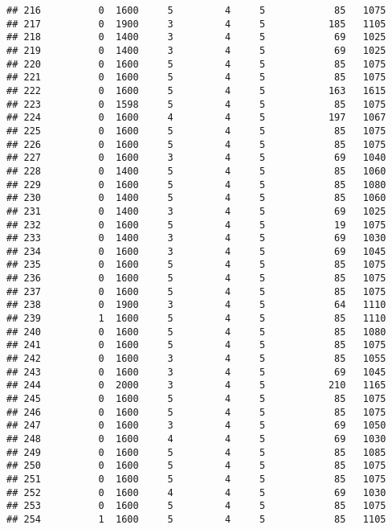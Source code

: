 \documentclass[]{article}
\begin{document}
\begin{verbatim}
## 216          0  1600     5         4     5            85   1075
## 217          0  1900     3         4     5           185   1105
## 218          0  1400     3         4     5            69   1025
## 219          0  1400     3         4     5            69   1025
## 220          0  1600     5         4     5            85   1075
## 221          0  1600     5         4     5            85   1075
## 222          0  1600     5         4     5           163   1615
## 223          0  1598     5         4     5            85   1075
## 224          0  1600     4         4     5           197   1067
## 225          0  1600     5         4     5            85   1075
## 226          0  1600     5         4     5            85   1075
## 227          0  1600     3         4     5            69   1040
## 228          0  1400     5         4     5            85   1060
## 229          0  1600     5         4     5            85   1080
## 230          0  1400     5         4     5            85   1060
## 231          0  1400     3         4     5            69   1025
## 232          0  1600     5         4     5            19   1075
## 233          0  1400     3         4     5            69   1030
## 234          0  1600     3         4     5            69   1045
## 235          0  1600     5         4     5            85   1075
## 236          0  1600     5         4     5            85   1075
## 237          0  1600     5         4     5            85   1075
## 238          0  1900     3         4     5            64   1110
## 239          1  1600     5         4     5            85   1110
## 240          0  1600     5         4     5            85   1080
## 241          0  1600     5         4     5            85   1075
## 242          0  1600     3         4     5            85   1055
## 243          0  1600     3         4     5            69   1045
## 244          0  2000     3         4     5           210   1165
## 245          0  1600     5         4     5            85   1075
## 246          0  1600     5         4     5            85   1075
## 247          0  1600     3         4     5            69   1050
## 248          0  1600     4         4     5            69   1030
## 249          0  1600     5         4     5            85   1085
## 250          0  1600     5         4     5            85   1075
## 251          0  1600     5         4     5            85   1075
## 252          0  1600     4         4     5            69   1030
## 253          0  1600     5         4     5            85   1075
## 254          1  1600     5         4     5            85   1105

\end{verbatim}
\end{document}
